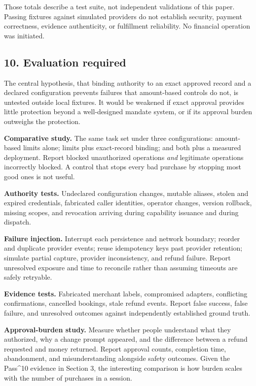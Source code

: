 \documentclass[
  11pt,
  letterpaper,
]{article}
\begin{document}
Those totals describe a test suite, not independent validations of this
paper. Passing fixtures against simulated providers do not establish
security, payment correctness, evidence authenticity, or fulfillment
reliability. No financial operation was initiated.

\subsection{10. Evaluation required}\label{evaluation-required}

The central hypothesis, that binding authority to an exact approved
record and a declared configuration prevents failures that amount-based
controls do not, is untested outside local fixtures. It would be
weakened if exact approval provides little protection beyond a
well-designed mandate system, or if its approval burden outweighs the
protection.

\textbf{Comparative study.} The same task set under three
configurations: amount-based limits alone; limits plus exact-record
binding; and both plus a measured deployment. Report blocked
unauthorized operations \emph{and} legitimate operations incorrectly
blocked. A control that stops every bad purchase by stopping most good
ones is not useful.

\textbf{Authority tests.} Undeclared configuration changes, mutable
aliases, stolen and expired credentials, fabricated caller identities,
operator changes, version rollback, missing scopes, and revocation
arriving during capability issuance and during dispatch.

\textbf{Failure injection.} Interrupt each persistence and network
boundary; reorder and duplicate provider events; reuse idempotency keys
past provider retention; simulate partial capture, provider
inconsistency, and refund failure. Report unresolved exposure and time
to reconcile rather than assuming timeouts are safely retryable.

\textbf{Evidence tests.} Fabricated merchant labels, compromised
adapters, conflicting confirmations, cancelled bookings, stale refund
events. Report false success, false failure, and unresolved outcomes
against independently established ground truth.

\textbf{Approval-burden study.} Measure whether people understand what
they authorized, why a change prompt appeared, and the difference
between a refund requested and money returned. Report approval counts,
completion time, abandonment, and misunderstanding alongside safety
outcomes. Given the Pass\^{}10 evidence in Section 3, the interesting
comparison is how burden scales with the number of purchases in a
session.
\end{document}
